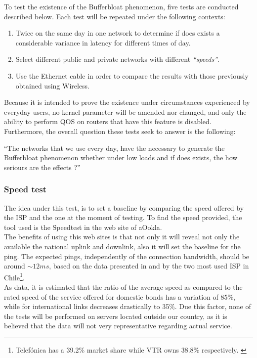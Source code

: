 To test the existence of the Bufferbloat phenomenon, five tests are conducted 
described below. Each test will be repeated under the following contexts:

\begin{enumerate}
\item Twice on the same day in one network to determine if does exists a 
considerable variance in latency for different times of day.
\item Select different public and private networks with different 
\textit{``speeds''}.
\item Use the Ethernet cable in order to compare the results with those 
previously obtained using Wireless.
\end{enumerate}

Because it is intended to prove the existence under circumstances experienced by
everyday users, no kernel parameter will be amended nor changed, and only the 
ability to perform QOS on routers that have this feature is disabled. 
Furthermore, the overall question these tests seek to answer is the following:\\

\begin{theoremnon}[]
``The networks that we use every day, have the necessary to generate the 
Bufferbloat phenomenon whether under low loads and if does exists, the how 
seriours are the effects ?''
\end{theoremnon}

\subsubsection{Speed test} 
The idea under this test, is to set a baseline by comparing the speed offered 
by the ISP and the one at the moment of testing. To find the speed provided, 
the  tool used is the Speedtest in the web site of aOokla.\\

The benefits of using this web sites is that not only it will reveal not only
the available the national uplink and downlink, also it will set the baseline
for the ping. The expected pings, independently of the connection bandwidth,
should be around $\sim12ms$, based on the data presented in \cite{netvtr} and
\cite{netmov} by the two most used ISP in Chile\footnote{Telef\'onica has a
39.2\% market share while VTR owns 38.8\% respectively. \cite{ispshares}}.\\

As data, it is estimated that the ratio of the average speed as compared to the
rated speed of the service offered for domestic bonds has a variation of 85\%,
while for international links decreases drastically to 35\%\cite{modcompqos}.
Due this factor, none of the tests will be performed on servers located outside
our country, as it is believed that the data will not very representative
regarding actual service.\\

